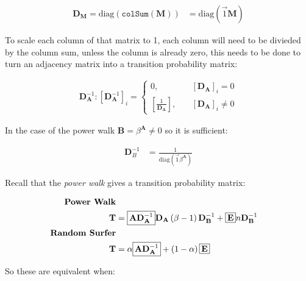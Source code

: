 \documentclass[11pt]{report}
\begin{document}
\begin{align}
    \mathbf{D}_{\mathbf{M}} = \mathrm{diag}\left( \mathtt{colSum} \left( \mathbf{M} \right) \right) &= \mathrm{diag} \left( \vec{1} \mathbf{M} \right)
\end{align}


To scale each column of that matrix to 1, each column will need to be divieded by the column sum, unless the column is already zero, this needs to be done to turn an adjacency matrix into a transition probability matrix:

\begin{align}
    \mathbf{D}_{\mathbf{A}} ^{- 1} :  \left[     \mathbf{D}_{\mathbf{A}} ^{- 1}  \right]_i =
    \begin{cases}
	0 ,& \quad \left[ \mathbf{D}_{\mathbf{A}} \right]_i = 0 \\
	\left[ \frac{1}{\mathbf{D}_{\mathbf{A}}} \right] ,& \enspace \enspace \left[ \mathbf{D}_{\mathbf{A}} \right]_i \neq 0
    \end{cases}
\end{align}

In the case of the power walk \(\mathbf{B}= \beta^{\mathbf{A}} \neq 0\) so it is sufficient:

\begin{align}
	\mathbf{D}_{B}^{- 1} &= \frac{1}{\mathrm{diag}\left( \vec{1}\beta^{\mathbf{A}} \right)} 
\end{align}



Recall that the \emph{power walk} gives a transition probability matrix:

\begin{align}
    \text{\textbf{Power Walk}} \nonumber \\
\mathbf{T} &= \text{\fboxsep=.2em\fbox{$\mathbf{A}\mathbf{D}_{\mathbf{A}}^{- 1}$}}  \mathbf{D}_{\mathbf{A}} \left( \beta - 1 \right) \mathbf{D}_{\mathbf{B}}^{- 1} + \text{\fboxsep=.2em\fbox{$\mathbf{E}$}} n \mathbf{D}_{\mathbf{B}}^{- 1}  \label{eq:pwbx}\\
    \text{\textbf{Random Surfer}} \nonumber \\
    \mathbf{T} &= \alpha \text{\fboxsep=.2em\fbox{$\mathbf{A}\mathbf{D}_{\mathbf{A}}^{- 1}$}}  + \left( 1-\alpha \right) \text{\fboxsep=.2em\fbox{$\mathbf{E}$}}
\end{align}

So these are equivalent when:
\end{document}
